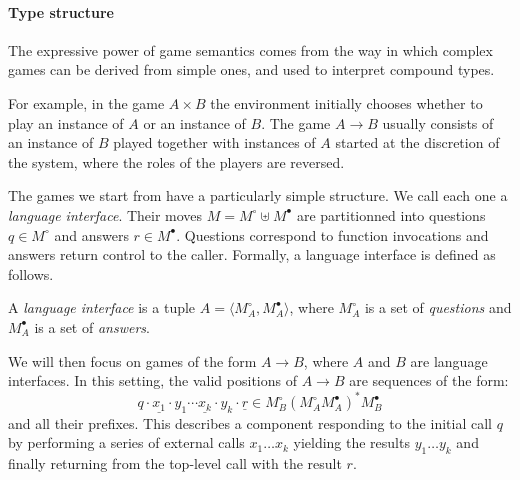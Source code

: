 \documentclass[acmsmall,authordraft]{acmart}
\newcommand{\que}{\circ}
\newcommand{\ans}{\bullet}
\begin{document}

\paragraph{Type structure} \label{sec:mainideas:gs:types} %

The expressive power of game semantics
comes from the way in which complex games can be derived from simple ones,
and used to interpret compound types.

For example,
in the game $A \times B$
the environment initially chooses whether to play
an instance of $A$ or an instance of $B$.
The game $A \rightarrow B$ usually consists of
an instance of $B$ played
together with instances of $A$
started at the discretion of the system,
where the roles of the players are reversed.

The games we start from have a particularly simple structure.
We call each one a \emph{language interface}.
Their moves $M = M^\que \uplus M^\ans$ are partitionned into
questions $q \in M^\que$ and answers $r \in M^\ans$.
Questions correspond to function invocations
and answers return control to the caller.
Formally,
a language interface is defined as follows.

\begin{definition} \label{def:li}
A \emph{language interface} is a tuple
$A = \langle M_A^\que, M_A^\ans \rangle$, where
$M_A^\que$ is a set of \emph{questions} and
$M_A^\ans$ is a set of \emph{answers}.
\end{definition}

We will then focus on games of the form $A \rightarrow B$,
where $A$ and $B$ are language interfaces.
In this setting,
the valid positions of $A \rightarrow B$ are
sequences of the form:
\[
  q \cdot \underline{x_1} \cdot y_1 \cdots
          \underline{x_k} \cdot y_k \cdot \underline{r} \in
  M_B^\que ( {M_A^\que} M_A^\ans )^* {M_B^\ans}
\]
and all their prefixes.
This describes a component responding to
the initial call $q$ by
performing a series of external calls $x_1 \ldots x_k$
yielding the results $y_1 \ldots y_k$
and finally returning from the top-level call
with the result $r$.


\end{document}
